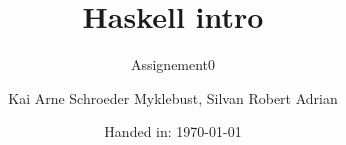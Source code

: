 \documentclass[12pt]{article}
\begin{document}
\title{Haskell intro}
\subtitle{Assignement0}

\author{Kai Arne Schroeder Myklebust, Silvan Robert Adrian}
\date{Handed in: \today}
	
\maketitle
\end{document}

